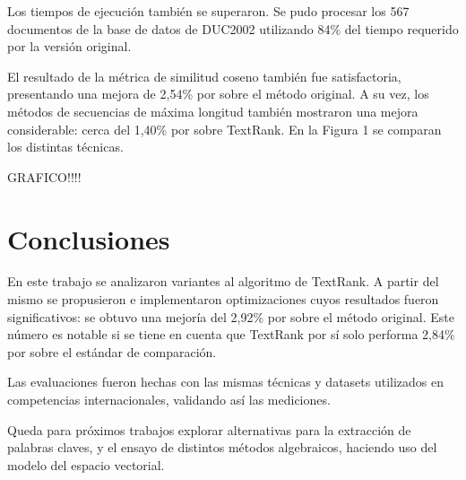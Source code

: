 \documentclass[a4paper]{article}
\begin{document}
Los tiempos de ejecución también se superaron. Se pudo procesar los 567 documentos de la base de datos de DUC2002 utilizando 84\% del tiempo requerido por la versión original.

El resultado de la métrica de similitud coseno también fue satisfactoria, presentando una mejora de 2,54\% por sobre el método original. A su vez, los métodos de secuencias de máxima longitud también mostraron una mejora considerable: cerca del 1,40\% por sobre TextRank. En la Figura 1 se comparan los distintas técnicas.

GRAFICO!!!!

\section{Conclusiones}
En este trabajo se analizaron variantes al algoritmo de TextRank. A partir del mismo se propusieron e implementaron optimizaciones cuyos resultados fueron significativos: se obtuvo una mejoría del 2,92\% por sobre el método original. Este número es notable si se tiene en cuenta que TextRank por sí solo performa 2,84\% por sobre el estándar de comparación.

Las evaluaciones fueron hechas con las mismas técnicas y datasets utilizados en competencias internacionales, validando así las mediciones.

Queda para próximos trabajos explorar alternativas para la extracción de palabras claves, y el ensayo de distintos métodos algebraicos, haciendo uso del modelo del espacio vectorial.


{}

\end{document}
